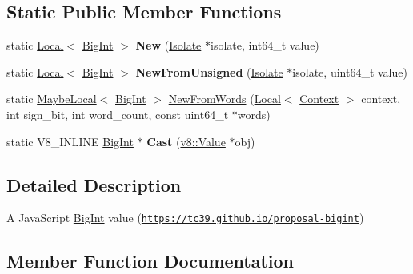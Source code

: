 \subsection*{Static Public Member Functions}
\begin{DoxyCompactItemize}
\item 
\mbox{\label{classv8_1_1BigInt_a2ae15b635778d6c84f7715c8fb75aab6}} 
static \mbox{\hyperlink{classv8_1_1Local}{Local}}$<$ \mbox{\hyperlink{classv8_1_1BigInt}{Big\+Int}} $>$ {\bfseries New} (\mbox{\hyperlink{classv8_1_1Isolate}{Isolate}} $\ast$isolate, int64\+\_\+t value)
\item 
\mbox{\label{classv8_1_1BigInt_afae6436f0bce457d6280a25377dca250}} 
static \mbox{\hyperlink{classv8_1_1Local}{Local}}$<$ \mbox{\hyperlink{classv8_1_1BigInt}{Big\+Int}} $>$ {\bfseries New\+From\+Unsigned} (\mbox{\hyperlink{classv8_1_1Isolate}{Isolate}} $\ast$isolate, uint64\+\_\+t value)
\item 
static \mbox{\hyperlink{classv8_1_1MaybeLocal}{Maybe\+Local}}$<$ \mbox{\hyperlink{classv8_1_1BigInt}{Big\+Int}} $>$ \mbox{\hyperlink{classv8_1_1BigInt_a2e315509efbc08fef90ef54d7e179e4d}{New\+From\+Words}} (\mbox{\hyperlink{classv8_1_1Local}{Local}}$<$ \mbox{\hyperlink{classv8_1_1Context}{Context}} $>$ context, int sign\+\_\+bit, int word\+\_\+count, const uint64\+\_\+t $\ast$words)
\item 
\mbox{\label{classv8_1_1BigInt_ad6d5b03552c5f81589d641ef2fc055d8}} 
static V8\+\_\+\+I\+N\+L\+I\+NE \mbox{\hyperlink{classv8_1_1BigInt}{Big\+Int}} $\ast$ {\bfseries Cast} (\mbox{\hyperlink{classv8_1_1Value}{v8\+::\+Value}} $\ast$obj)
\end{DoxyCompactItemize}


\subsection{Detailed Description}
A Java\+Script \mbox{\hyperlink{classv8_1_1BigInt}{Big\+Int}} value (\href{https://tc39.github.io/proposal-bigint}{\tt https\+://tc39.\+github.\+io/proposal-\/bigint}) 

\subsection{Member Function Documentation}
\mbox{\label{classv8_1_1BigInt_a6478543bf9a595571d76e60fd3f2af0e}} 

